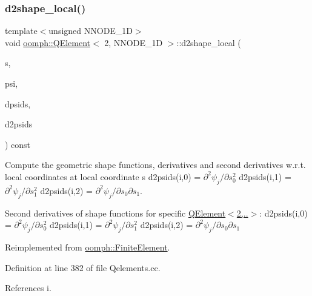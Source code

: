 \subsubsection{\texorpdfstring{d2shape\+\_\+local()}{d2shape\_local()}}
{\footnotesize\ttfamily template$<$unsigned N\+N\+O\+D\+E\+\_\+1D$>$ \\
void \hyperlink{classoomph_1_1QElement}{oomph\+::\+Q\+Element}$<$ 2, N\+N\+O\+D\+E\+\_\+1D $>$\+::d2shape\+\_\+local (\begin{DoxyParamCaption}\item[{const \hyperlink{classoomph_1_1Vector}{Vector}$<$ double $>$ \&}]{s,  }\item[{\hyperlink{classoomph_1_1Shape}{Shape} \&}]{psi,  }\item[{\hyperlink{classoomph_1_1DShape}{D\+Shape} \&}]{dpsids,  }\item[{\hyperlink{classoomph_1_1DShape}{D\+Shape} \&}]{d2psids }\end{DoxyParamCaption}) const\hspace{0.3cm}{\ttfamily [virtual]}}



Compute the geometric shape functions, derivatives and second derivatives w.\+r.\+t. local coordinates at local coordinate s d2psids(i,0) = $ \partial^2 \psi_j / \partial s_0^2 $ d2psids(i,1) = $ \partial^2 \psi_j / \partial s_1^2 $ d2psids(i,2) = $ \partial^2 \psi_j / \partial s_0 \partial s_1 $. 

Second derivatives of shape functions for specific \hyperlink{classoomph_1_1QElement_3_012_00_01NNODE__1D_01_4_a6437dbbbf374520208a72e1b1b57cf04}{Q\+Element$<$2,..$>$}\+: d2psids(i,0) = $ \partial^2 \psi_j / \partial s_0^2 $ d2psids(i,1) = $ \partial^2 \psi_j / \partial s_1^2 $ d2psids(i,2) = $ \partial^2 \psi_j / \partial s_0 \partial s_1 $ 

Reimplemented from \hyperlink{classoomph_1_1FiniteElement_a53e5051582d9da07b9d35da9debd0cd7}{oomph\+::\+Finite\+Element}.



Definition at line 382 of file Qelements.\+cc.



References i.

\mbox{\label{classoomph_1_1QElement_3_012_00_01NNODE__1D_01_4_a60e23370230bd88d5881dd42fb48a980}} 
